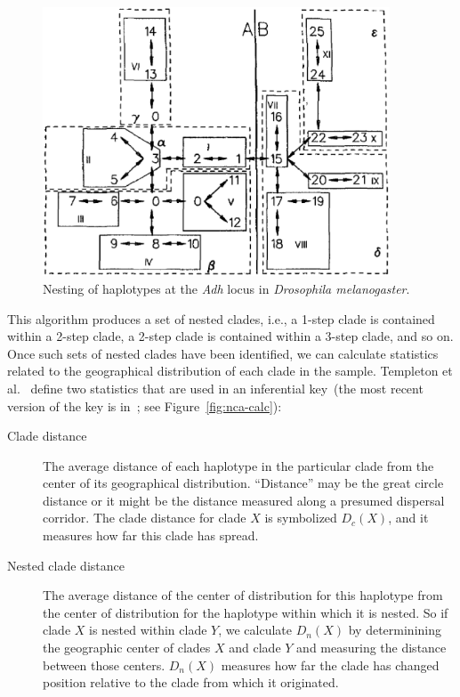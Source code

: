 \begin{figure}
\begin{center}
\includegraphics[height=8cm]{nca-nesting.eps}
\end{center}
\caption{Nesting of haplotypes at the {\it Adh\/} locus in {\it
    Drosophila melanogaster}.}\label{fig:nca-nesting}
\end{figure}

This algorithm produces a set of nested clades, i.e., a 1-step clade
is contained within a 2-step clade, a 2-step clade is contained within
a 3-step clade, and so on. Once such sets of nested clades have been
identified, we can calculate statistics related to the geographical
distribution of each clade in the sample. Templeton et
al.~\cite{Templeton-etal-1995} define two statistics that are used in
an inferential key~(the most recent version of the key is
in~\cite{Templeton-2004}; see Figure~\ref{fig:nca-calc}):

\begin{description}

\item[Clade distance] The average distance of each haplotype in the
  particular clade from the center of its geographical
  distribution. ``Distance'' may be the great circle distance or it
  might be the distance measured along a presumed dispersal
  corridor. The clade distance for clade $X$ is symbolized $D_c(X)$,
  and it measures how far this clade has spread.

\item[Nested clade distance] The average distance of the center of
  distribution for this haplotype from the center of distribution for
  the haplotype within which it is nested. So if clade $X$ is nested
  within clade $Y$, we calculate $D_n(X)$ by determinining the
  geographic center of clades $X$ and clade $Y$ and measuring the
  distance between those centers. $D_n(X)$ measures how far the clade
  has changed position relative to the clade from which it
  originated.

\end{description}

